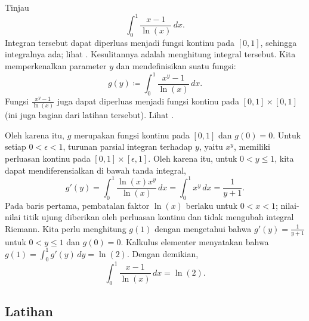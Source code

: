 \begin{example} \label{example:counterexamplediffunder}
Tinjau
\begin{equation*}
\int_0^{1} \frac{x-1}{\ln(x)} \,dx .
\end{equation*}
Integran tersebut
dapat diperluas menjadi fungsi kontinu pada $[0,1]$, sehingga
integralnya ada; lihat .  Kesulitannya adalah menghitung integral tersebut.
Kita memperkenalkan parameter $y$
dan mendefinisikan suatu fungsi:
\begin{equation*}
g(y) \coloneqq \int_0^{1} \frac{x^y-1}{\ln(x)} \,dx .
\end{equation*}
Fungsi
$\frac{x^y-1}{\ln(x)}$
juga dapat diperluas menjadi fungsi kontinu pada
$[0,1] \times [0,1]$ (ini juga bagian dari latihan tersebut).
Lihat .
\begin{myfigureht}
\caption{Grafik $z= \frac{x^y-1}{\ln(x)}$ pada $[0,1] \times [0,1]$.\label{fig:diffunderexample}}
\end{myfigureht}


Oleh karena itu,
$g$ merupakan fungsi kontinu pada $[0,1]$ dan $g(0) = 0$.
Untuk setiap $0 < \epsilon < 1$, turunan parsial integran terhadap $y$, yaitu $x^y$,
memiliki perluasan kontinu pada $[0,1] \times [\epsilon,1]$.  Oleh karena itu,
untuk $0 < y \leq 1$, kita dapat mendiferensialkan di bawah tanda integral,
\begin{equation*}
g'(y) =
\int_0^{1} \frac{\ln(x) x^y}{\ln(x)} \,dx 
=
\int_0^{1} x^y \,dx =
\frac{1}{y+1} .
\end{equation*}
Pada baris pertama, pembatalan faktor $\ln(x)$ berlaku untuk $0<x<1$; nilai-nilai
titik ujung diberikan oleh perluasan kontinu dan tidak mengubah integral Riemann.
Kita perlu menghitung $g(1)$ dengan mengetahui bahwa $g'(y) = \frac{1}{y+1}$ untuk
$0<y\leq1$ dan $g(0) = 0$.  Kalkulus elementer menyatakan bahwa
$g(1) = \int_0^1 g'(y)\,dy = \ln(2)$.
Dengan demikian,
\begin{equation*}
\int_0^{1} \frac{x-1}{\ln(x)} \,dx  = \ln(2).
\end{equation*}
\end{example}

\subsection{Latihan}

